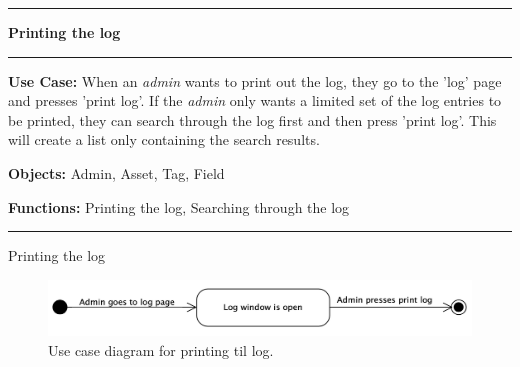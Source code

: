 \begin{use_case}[H]
    \hrule
    \vskip 0.3cm
    \Large
    \begin{center}
    
        \textbf{Printing the log}
        
    \end{center}
    \vskip 0.1cm
    \hrule
    \vskip 0.2cm
    \normalsize
    
    \textbf{Use Case:} When an \textit{admin} wants to print out the log, they go to the 'log' page and presses 'print log'. If the \textit{admin} only wants a limited set of the log entries to be printed, they can search through the log first and then press 'print log'. This will create a list only containing the search results.
    
    \vskip 0.2cm
    
    \textbf{Objects:} Admin, Asset, Tag, Field
    
    \vskip 0.2cm
    
    \textbf{Functions:} Printing the log, Searching through the log
    
    \vskip 0.4cm
    \hrule
    \vskip 0.2cm
    \caption{Printing the log} \label{use_case:printing_the_log}
\end{use_case}

\begin{figure}[H]
    \centering
    \includegraphics[width=1.0\textwidth]{figures/PrintLog.png}
    \caption{Use case diagram for printing til log.}
    \label{fig:UseCasePrintLog}
\end{figure}